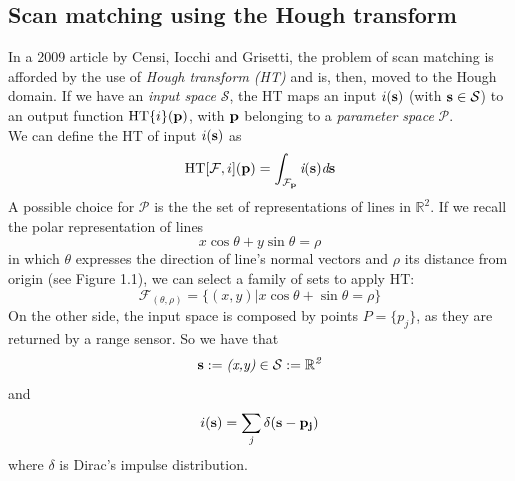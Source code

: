 \documentclass[a4paper, onecolumn]{report}
\begin{document}
\subsection{Scan matching using the Hough transform}
In a 2009 article by Censi, Iocchi and Grisetti, the problem of scan matching is afforded by the use of \emph{Hough transform (HT)} and is, then, moved to the Hough domain. If we have an \emph{input space} $\mathcal{S}$, the HT maps an input $i(\bf{s})$ (with $\bf{s} \in \mathcal{S}$) to an output function $\mbox{HT}\{i\}(\bf{p})$, with $\bf{p}$ belonging to a \emph{parameter space} $\mathcal{P}$. \\
We can define the HT of input $i(\bf{s})$ as
\begin{equation}
	\mbox{HT}[\mathcal{F}, i](\bf{p}) = \int_{\mathcal{F}_{\bf{p}}} \emph{i}(\bf{s}) \emph{d}\bf{s}
\end{equation}
A possible choice for $\mathcal{P}$ is the the set of representations of lines in $\mathbb{R}^2$. If we recall the polar representation of lines 
\begin{equation}
	x\cos\theta + y\sin\theta = \rho
\end{equation}
in which $\theta$ expresses the direction of line's normal vectors and $\rho$ its distance from origin (see Figure 1.1), we can select a family of sets to apply HT:
\begin{equation}
	\mathcal{F}_{(\theta, \rho)} =\{(x,y) | x\cos\theta + \sin\theta = \rho\}
\end{equation}
On the other side, the input space is composed by points $P = \{p_j\}$, as they are returned by a range sensor. So we have that
\begin{equation}
	\bf{s} := \emph{(x,y)} \in \mathcal{S} := \mathbb{R}^\emph{2}
\end{equation}
and
\begin{equation}
	i(\bf{s}) = \sum_{\emph{j}} \delta(\bf{s} - \bf{p_j})
\end{equation}
where $\delta$ is Dirac's impulse distribution.
\end{document}
